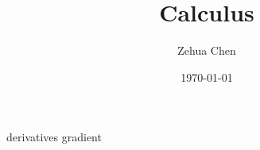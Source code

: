 \documentclass{report}
\title{Calculus}
\author{Zehua Chen}
\date{\today}
\begin{document}
  \maketitle
  \tableofcontents

  {derivatives}
  {gradient}
\end{document}
